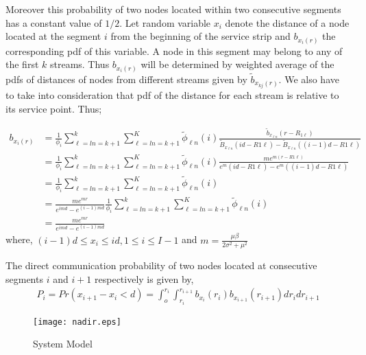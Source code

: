 \documentclass[journal]{IEEEtran}
\begin{document}
Moreover this probability of two nodes located within two consecutive segments has a constant value of $ 1/2 $.
Let random variable  $ x_{i}  $ denote the distance of a node located at the segment $i$ from the beginning of the service strip and $ b_{x_{i}(r)}$  the corresponding pdf of this variable. A node in this segment may belong to any of the first $k$ streams. Thus $ b_{x_{i}(r)} $ will be determined by weighted average of the pdfs of distances of nodes from different streams given by $ \tilde{b}_{x_{kj}(r)}$. We also have to take into consideration that pdf of the distance for each stream is relative to its service point. Thus;

\hspace{-0.5cm}
\tiny
\begin{align}
b_{x_{i}(r)}&=\frac{1}{\phi _i}\sum_{\ell =ln=k+1}^{k}\sum_{\ell  \nonumber =ln=k+1}^{K}\tilde{\phi}_{\ell{n}}(i)\frac{\tilde{b}_{x_{\ell{n}}}(r-R_{1{\ell}})}{\tilde{B}_{x_{\ell{n}}}(id-R1{\ell}) -\tilde{B}_{x_{\ell{n}}}((i-1)d-R{1{\ell}})}\\
&=\frac{1}{\phi_{i}}\sum_{\ell  \nonumber =ln=k+1}^{k}\sum_{\ell=ln=k+1}^{K}\tilde{\phi}_{\ell{n}}(i)\frac{me^{m(r-R1{\ell})}}{e^m(id-R1{\ell})-e^m((i-1)d-R1{\ell})}\\ \nonumber
&=\frac{1}{\phi_{i}}\sum_{\ell =ln=k+1}^{k}\sum_{\ell =ln=k+1}^{K}\tilde{\phi}_{\ell{n}}(i)\\\nonumber
&=\frac{me^{mr}}{e^{imd}-e^{(i-1)md}}\frac{1}{\phi_{i}}\sum_{\ell =ln=k+1}^{k}\sum_{\ell =ln=k+1}^{K}\tilde{\phi}_{\ell{n}}(i)\\
&=\frac{me^{mr}}{e^{imd}-e^{(i-1)md}}
\end{align}
\normalsize
where, $ (i-1)d\le{x_{i}}\le{id}, 1\le{i}\le{I-1}$ and $m=\frac{\mu\beta}{2\sigma^2+\mu^2}$

The direct communication probability of two nodes located at consecutive segments $i$ and $i+1$ respectively is given by,
\tiny
\begin{eqnarray}
P_{i}=Pr(x_{i+1}-x_{i}<d)=\int_{o}^{r_{i}}\int_{r_{i}}^{r_{i+1}}b_{x_{i}}(r_{i})b_{x_{i+1}}
(r_{i+1})dr_{i}dr_{i+1}
\end{eqnarray}
\normalsize


\begin{figure*}[t]
\centering
  {\texttt{[image: nadir.eps]}}
  \caption{System Model}
\end{figure*}
\end{document}
